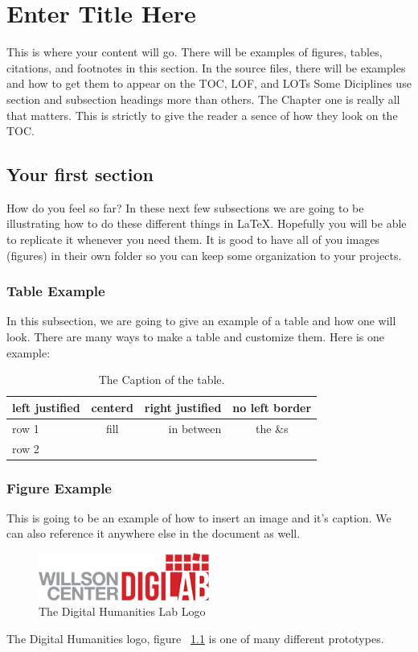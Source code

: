 \documentclass[./dissertation.tex]{subfiles}
\begin{document}
    \chapter{Enter Title Here}
    This is where your content will go. There will be examples of figures, tables, citations, and footnotes in this section. In the source files, there will be examples and how to get them to appear on the TOC, LOF, and LOTs Some Diciplines use section and subsection headings more than others. The Chapter one is really all that matters. This is strictly to give the reader a sence of how they look on the TOC.
    \section{Your first section}
      How do you feel so far? In these next few subsections we are going to be illustrating how to do these different things in LaTeX. Hopefully you will be able to replicate it whenever you need them.
      It is good to have all of you images (figures) in their own folder so you can keep some organization to your projects.

      \subsection{Table Example}
        In this subsection, we are going to give an example of a table and how one will look. There are many ways to make a table and customize them. Here is one example:


      \begin{table}[ht]
        \centering
      \begin{tabular}[c]{|l|c|rc|}
        \hline
        left justified  & centerd  & right justified  & no left border\\
        \hline
        row 1 & fill & in between & the \&s\\
        row 2 & & &\\
        \hline

      \end{tabular}
      \caption{The Caption of the table.}
      \label{table:someTable}
      \end{table}



      \subsection{Figure Example}
      This is going to be an example of how to insert an image and it's caption. We can also reference it anywhere else in the document as well.
      \begin{figure}[h]
        \centering\includegraphics[width=0.5\textwidth]{figures/digilab_logo}
        \caption{The Digital Humanities Lab Logo}
        \label{fig:digilogo}
      \end{figure}
      The Digital Humanities logo, figure ~\ref{fig:digilogo} is one of many different prototypes.
\end{document}
